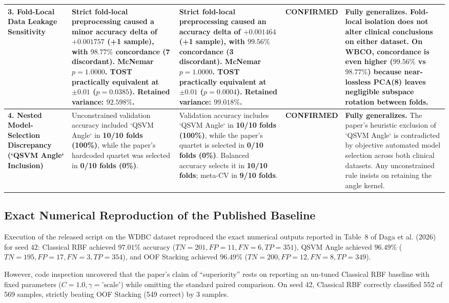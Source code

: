 \documentclass[journal,twocolumn]{IEEEtran}
\begin{document}
\begin{table}[t]
\begin{tabularx}{\textwidth}{p{}p{}p{}p{}X}
\textbf{3. Fold-Local Data Leakage Sensitivity} & Strict fold-local preprocessing caused a minor accuracy delta of \textbf{$+0.001757$} (+1 sample), with \textbf{$98.77\%$ concordance} (7 discordant). McNemar $p=1.0000$. TOST practically equivalent at $\pm 0.01$ ($p=0.0385$). Retained variance: $92.598\%$. & Strict fold-local preprocessing caused an accuracy delta of \textbf{$+0.001464$} (+1 sample), with \textbf{$99.56\%$ concordance} (3 discordant). McNemar $p=1.0000$. TOST practically equivalent at $\pm 0.01$ ($p=0.0004$). Retained variance: $99.018\%$. & \textbf{CONFIRMED} & \textbf{Fully generalizes.} Fold-local isolation does not alter clinical conclusions on either dataset. On WBCO, concordance is even higher ($99.56\%$ vs $98.77\%$) because near-lossless PCA(8) leaves negligible subspace rotation between folds. \\
\midrule
\textbf{4. Nested Model-Selection Discrepancy (`QSVM Angle` Inclusion)} & Unconstrained validation accuracy included `QSVM Angle` in \textbf{10/10 folds (100\%)}, while the paper's hardcoded quartet was selected in \textbf{0/10 folds (0\%)}. & Validation accuracy includes `QSVM Angle` in \textbf{10/10 folds (100\%)}, while the paper's quartet is selected in \textbf{0/10 folds (0\%)}. Balanced accuracy selects it in \textbf{10/10 folds}; meta-CV in \textbf{9/10 folds}. & \textbf{CONFIRMED} & \textbf{Fully generalizes.} The paper's heuristic exclusion of `QSVM Angle` is contradicted by objective automated model selection across both clinical datasets. Any unconstrained rule insists on retaining the angle kernel. \\
\bottomrule
\end{tabularx}
\end{table}

\subsection{Exact Numerical Reproduction of the Published Baseline}
Execution of the released script on the WDBC dataset reproduced the exact numerical outputs reported in Table~8 of Daga et al. (2026) for seed $42$: Classical RBF achieved $97.01\%$ accuracy ($TN=201, FP=11, FN=6, TP=351$), QSVM Angle achieved $96.49\%$ ($TN=195, FP=17, FN=3, TP=354$), and OOF Stacking achieved $96.49\%$ ($TN=200, FP=12, FN=8, TP=349$). 

However, code inspection uncovered that the paper's claim of ``superiority'' rests on reporting an un-tuned Classical RBF baseline with fixed parameters ($C=1.0, \gamma=\text{'scale'}$) while omitting the standard paired comparison. On seed 42, Classical RBF correctly classified 552 of 569 samples, strictly beating OOF Stacking (549 correct) by 3 samples.
\end{document}
